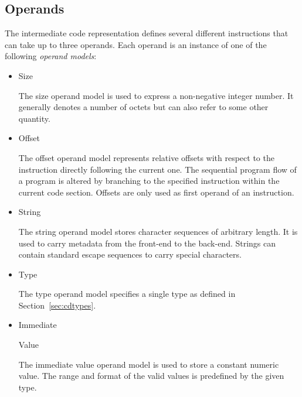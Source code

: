 \subsection{Operands}\label{sec:cdoperands}

The intermediate code representation defines several different instructions that can take up to three operands.
Each operand is an instance of one of the following \emph{operand models}:

\newcommand{\cdoperand}[1]{\hypertarget{cd:#1}{#1}}
\newcommand{\cdoperandref}[1]{\hyperlink{cd:#1}{\textit{#1}}}

\begin{itemize}

\item\cdoperand{Size}\alignright{}\nopagebreak

The size operand model is used to express a non-negative integer number.
It generally denotes a number of octets but can also refer to some other quantity.

\item\cdoperand{Offset}\alignright{}\nopagebreak

The offset operand model represents relative offsets with respect to the instruction directly following the current one.
The sequential program flow of a program is altered by branching to the specified instruction within the current code section.
Offsets are only used as first operand of an instruction.

\item\cdoperand{String}\alignright{}\nopagebreak

The string operand model stores character sequences of arbitrary length.
It is used to carry metadata from the front-end to the back-end.
Strings can contain standard escape sequences to carry special characters.

\item\cdoperand{Type}\alignright{}\nopagebreak

The type operand model specifies a single type as defined in Section~\ref{sec:cdtypes}.

\item\cdoperand{Immediate} Value\alignright{}\nopagebreak

The immediate value operand model is used to store a constant numeric value.
The range and format of the valid values is predefined by the given type.


\end{itemize}
